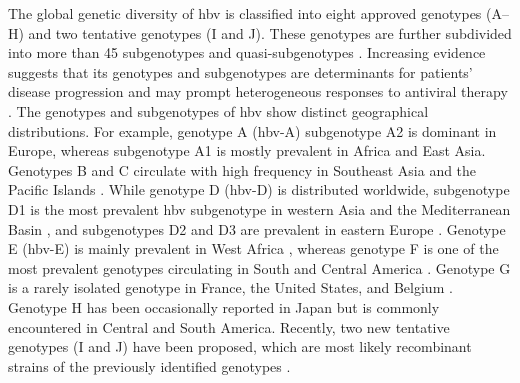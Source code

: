 The global genetic diversity of \gls{hbv} is classified into eight approved genotypes (A--H) and two tentative genotypes (I and J).
These genotypes are further subdivided into more than 45 subgenotypes and quasi-subgenotypes \citep{pourkarim2014molecularidentification,thijssen2020novel}.
Increasing evidence suggests that its genotypes and subgenotypes are determinants for patients' disease progression and may prompt heterogeneous responses to antiviral therapy \citep{mcmahon2009influence,croagh2015genotypes,shen2014hepatitis,pourkarim2014molecularcharacterization,zhang2020rapidly,mina2015genomic}.
The genotypes and subgenotypes of \gls{hbv} show distinct geographical distributions.
For example, genotype A (\gls{hbv}-A) subgenotype A2 is dominant in Europe, whereas subgenotype A1 is mostly prevalent in Africa and East Asia.
Genotypes B and C circulate with high frequency in Southeast Asia and the Pacific Islands \citep{norder2004genetic}.
While genotype D (\gls{hbv}-D) is distributed worldwide, subgenotype D1 is the most prevalent \gls{hbv} subgenotype in western Asia and the Mediterranean Basin \citep{zehender2012spatial,al-qahtani2020molecular,trovao2022reconstruction}, and subgenotypes D2 and D3 are prevalent in eastern Europe \citep{pourkarim2014molecularidentification,pineda-pena2015epidemiological}.
Genotype E (\gls{hbv}-E) is mainly prevalent in West Africa \citep{ingasia2020global}, whereas genotype F is one of the most prevalent genotypes circulating in South and Central America \citep{pujol2020hepatitis}.
Genotype G is a rarely isolated genotype in France, the United States, and Belgium \citep{kay2007hepatitis,mina2015genomic}.
Genotype H has been occasionally reported in Japan but is commonly encountered in Central and South America.
Recently, two new tentative genotypes (I and J) have been proposed, which are most likely recombinant strains of the previously identified genotypes \citep{pourkarim2014molecularidentification}.

